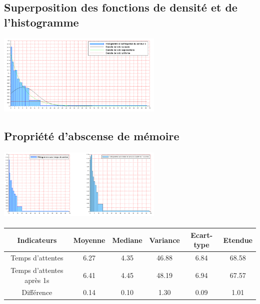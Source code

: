 \documentclass{article}
\begin{document}
\paragraph{}

\subsection{Superposition des fonctions de densité et de l'histogramme}
\begin{center}
\includegraphics[width=300px]{img/S3_densite.png}
\end{center}
\paragraph{}

\subsection{Propriété d'abscense de mémoire}
\begin{center}
\includegraphics[width=300px]{img/S3_mem.png}
\end{center}
\paragraph{}

\begin{center}
\begin{tabular}{|c|c|c|c|c|c|}
  \hline
  Indicateurs & Moyenne & Mediane & Variance & Ecart-type & Etendue \\
  \hline
  Temps d'attentes & 6.27 & 4.35 & 46.88 & 6.84 & 68.58 \\
  Temps d'attentes après 1s & 6.41 & 4.45 & 48.19 & 6.94 & 67.57 \\
  Différence & 0.14 & 0.10 & 1.30 & 0.09 & 1.01 \\
  \hline
\end{tabular}
\end{center}
\end{document}
